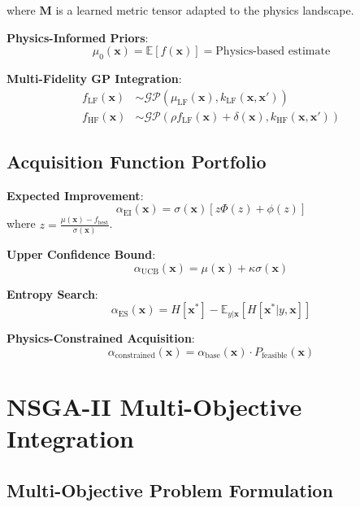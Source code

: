 \documentclass[11pt,a4paper]{article}
\begin{document}
where $\mathbf{M}$ is a learned metric tensor adapted to the physics landscape.

\textbf{Physics-Informed Priors}:
\begin{equation}
\mu_0(\mathbf{x}) = \mathbb{E}[f(\mathbf{x})] = \text{Physics-based estimate}
\end{equation}

\textbf{Multi-Fidelity GP Integration}:
\begin{align}
f_{\text{LF}}(\mathbf{x}) &\sim \mathcal{GP}(\mu_{\text{LF}}(\mathbf{x}), k_{\text{LF}}(\mathbf{x}, \mathbf{x}')) \\
f_{\text{HF}}(\mathbf{x}) &\sim \mathcal{GP}(\rho f_{\text{LF}}(\mathbf{x}) + \delta(\mathbf{x}), k_{\text{HF}}(\mathbf{x}, \mathbf{x}'))
\end{align}

\subsection{Acquisition Function Portfolio}

\textbf{Expected Improvement}:
\begin{equation}
\alpha_{\text{EI}}(\mathbf{x}) = \sigma(\mathbf{x}) \left[ z \Phi(z) + \phi(z) \right]
\end{equation}
where $z = \frac{\mu(\mathbf{x}) - f_{\text{best}}}{\sigma(\mathbf{x})}$.

\textbf{Upper Confidence Bound}:
\begin{equation}
\alpha_{\text{UCB}}(\mathbf{x}) = \mu(\mathbf{x}) + \kappa \sigma(\mathbf{x})
\end{equation}

\textbf{Entropy Search}:
\begin{equation}
\alpha_{\text{ES}}(\mathbf{x}) = H[\mathbf{x}^*] - \mathbb{E}_{y|\mathbf{x}}[H[\mathbf{x}^* | y, \mathbf{x}]]
\end{equation}

\textbf{Physics-Constrained Acquisition}:
\begin{equation}
\alpha_{\text{constrained}}(\mathbf{x}) = \alpha_{\text{base}}(\mathbf{x}) \cdot P_{\text{feasible}}(\mathbf{x})
\end{equation}

\section{NSGA-II Multi-Objective Integration}

\subsection{Multi-Objective Problem Formulation}
\end{document}
